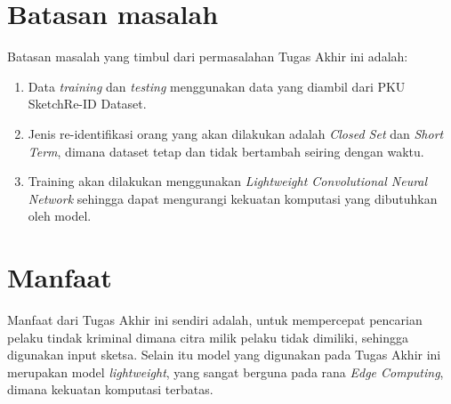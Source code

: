 \vspace{1ex}

\section{Batasan masalah}
\vspace{1ex}
Batasan masalah yang timbul dari permasalahan Tugas Akhir ini adalah:
\vspace{1ex}
\begin{enumerate}
	\vspace{-2mm}
	\item Data \textit{training} dan \textit{testing} menggunakan data yang diambil dari PKU SketchRe-ID Dataset.
	\vspace{-2mm}
	\item Jenis re-identifikasi orang yang akan dilakukan adalah \textit{Closed Set} dan \textit{Short Term}, dimana dataset tetap dan tidak bertambah seiring dengan waktu.
	\vspace{-2mm}
	\item Training akan dilakukan menggunakan \textit{Lightweight Convolutional Neural Network} sehingga dapat mengurangi kekuatan komputasi yang dibutuhkan oleh model.
\end{enumerate}
\vspace{1ex}

\section{Manfaat}
\vspace{1ex}
Manfaat dari Tugas Akhir ini sendiri adalah, untuk mempercepat pencarian pelaku tindak kriminal dimana citra milik pelaku tidak dimiliki, sehingga digunakan input sketsa. Selain itu model yang digunakan pada Tugas Akhir ini merupakan model \textit{lightweight}, yang sangat berguna pada rana \textit{Edge Computing}, dimana kekuatan komputasi terbatas.
